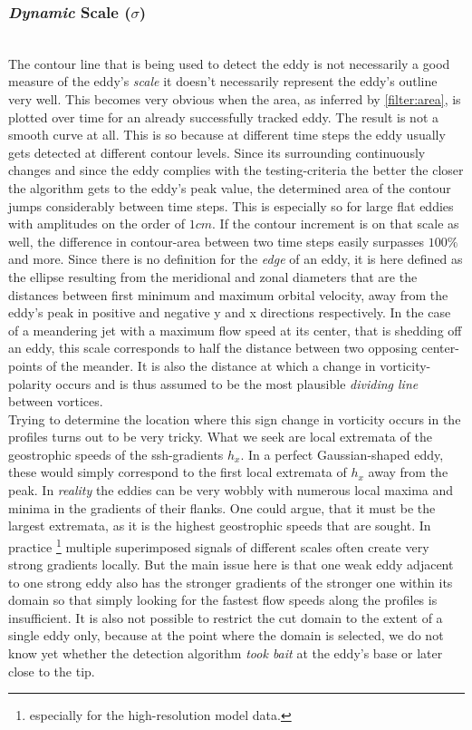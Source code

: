 \subsubsection{\textit{Dynamic} Scale ($\sigma$)} \label{filter:dynscale}
\\
The contour line that is being used to detect the eddy is not
necessarily a good measure of the eddy's \textit{scale} \ie it doesn't
necessarily represent the eddy's outline very well. This becomes very 
obvious when the area, as inferred by \ref{filter:area}, is plotted over time
for an already successfully tracked eddy. The result is not a smooth curve at
all. This is so because at different time steps the eddy usually gets detected
at different contour levels. Since its surrounding continuously changes and
since the eddy complies with the testing-criteria the better the closer the
algorithm gets to the eddy's peak value, the determined area of the contour
jumps considerably between time steps. This is especially so for large flat
eddies with amplitudes on the order of $1cm$. If the contour increment is on
that scale as well, the difference in contour-area between two time steps 
easily surpasses $100\%$ and more. 
Since there is no definition for the \textit{edge} of an eddy, it is here
defined as the ellipse resulting from the meridional and zonal diameters that
are the distances between first minimum and maximum orbital velocity, away from
the eddy's peak in positive and negative y and x directions respectively. 
In the case of a meandering jet with a maximum flow speed at its center, that
is shedding off an eddy, this scale corresponds to half the distance between
two opposing center-points of the meander. It is also the distance at which a
change in vorticity-polarity occurs and is thus assumed to be the most plausible
\textit{dividing line} between vortices. \\
Trying to determine the location where this sign change in vorticity occurs in the profiles turns out to be very tricky. What we seek are local extremata of the geostrophic speeds \ie of the ssh-gradients $h_x$. In a perfect Gaussian-shaped eddy, these would simply correspond to the first local extremata of $h_x$ away from the peak. In \textit{reality} the eddies can be very wobbly with numerous local maxima and minima in the gradients of their flanks. One could argue, that it must be the largest extremata, as it is the highest geostrophic speeds that are sought. In practice \footnote{especially for the high-resolution model data.} multiple superimposed signals of different scales often create very strong gradients locally. But the main issue here is that one weak eddy adjacent to one strong eddy also has the stronger gradients of the stronger one within its domain so that simply looking for the fastest flow speeds along the profiles is insufficient. It is also not possible to restrict the cut domain to the extent of a single eddy only, because at the point where the domain is selected, we do not know yet whether the detection algorithm \textit{took bait} at the eddy's base or later close to the tip. \\
